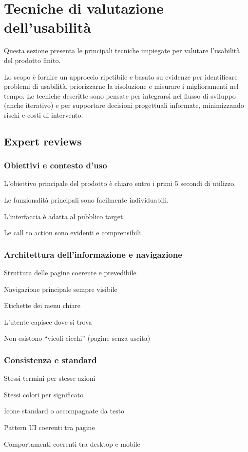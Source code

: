\section{Tecniche di valutazione dell'usabilità}

Questa sezione presenta le principali tecniche impiegate per valutare l'usabilità del prodotto finito.

Lo scopo è fornire un approccio ripetibile e basato su evidenze per identificare problemi di usabilità, priorizzarne la risoluzione e misurare i miglioramenti nel tempo. Le tecniche descritte sono pensate per integrarsi nel flusso di sviluppo (anche iterativo) e per supportare decisioni progettuali informate, minimizzando rischi e costi di intervento.

\subsection{Expert reviews}
\subsubsection{Obiettivi e contesto d'uso}
\begin{todolist}
    \item L'obiettivo principale del prodotto è chiaro entro i primi 5 secondi di utilizzo.
    \item Le funzionalità principali sono facilmente individuabili.
    \item L'interfaccia è adatta al pubblico target.
    \item Le call to action sono evidenti e comprensibili.
\end{todolist}
\subsubsection{Architettura dell'informazione e navigazione}
\begin{todolist}
	\item Struttura delle pagine coerente e prevedibile
	\item Navigazione principale sempre visibile
	\item Etichette dei menu chiare
	\item L'utente capisce dove si trova
	\item Non esistono ``vicoli ciechi'' (pagine senza uscita)
\end{todolist}
\subsubsection{Consistenza e standard}
\begin{todolist}
	\item Stessi termini per stesse azioni
	\item Stessi colori per significato
	\item Icone standard o accompagnate da testo
	\item Pattern UI coerenti tra pagine
	\item Comportamenti coerenti tra desktop e mobile
\end{todolist}
